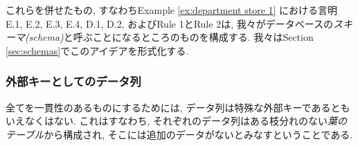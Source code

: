 
これらを併せたもの, すなわちExample \ref{ex:department store 1} における言明 E.1, E.2, E.3, E.4, D.1, D.2, およびRule 1とRule 2は, 我々がデータベースの\emph{スキーマ(schema)}と呼ぶことになるところのものを構成する.  我々はSection \ref{sec:schemas}でこのアイデアを形式化する.


\subsubsection{外部キーとしてのデータ列}


全てを一貫性のあるものにするためには, データ列は特殊な外部キーであるともいえなくはない. これはすなわち, それぞれのデータ列はある枝分れのない\emph{葉のテーブル}から構成され, そこには追加のデータがないとみなすということである.

